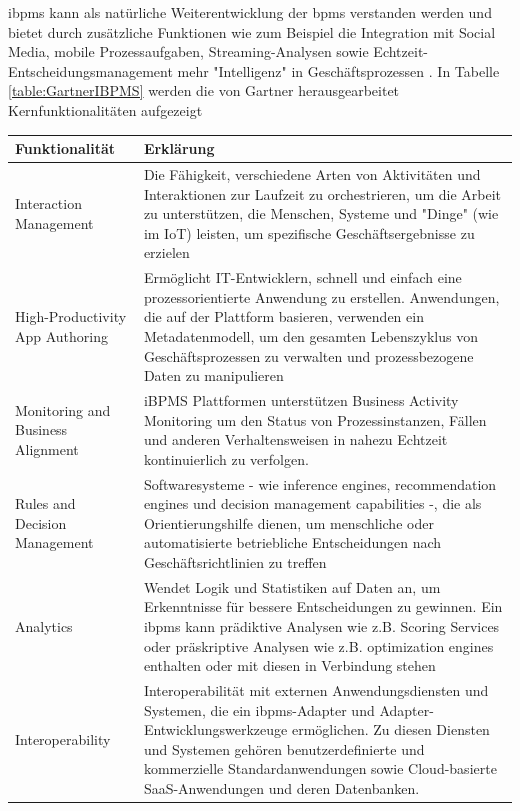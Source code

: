 \documentclass[a4paper, 12pt, twoside, headsepline=true]{scrartcl} %
\begin{document}
\ac{ibpms} kann als natürliche Weiterentwicklung der \ac{bpms} verstanden werden und bietet durch zusätzliche Funktionen wie zum Beispiel die Integration mit Social Media, mobile Prozessaufgaben, Streaming-Analysen sowie Echtzeit-Entscheidungsmanagement mehr "Intelligenz" in Geschäftsprozessen \cite{onibpms}. 
In Tabelle \ref{table:GartnerIBPMS} werden die von Gartner herausgearbeitet Kernfunktionalitäten aufgezeigt
\begin{table}[H]
	\begin{tabularx}{\textwidth}{@{}lL@{}} 
		\toprule
		\textbf{Funktionalität} & \textbf{Erklärung} 
		\\ \midrule
		Interaction Management & Die Fähigkeit, verschiedene Arten von Aktivitäten und Interaktionen zur Laufzeit zu orchestrieren, um die Arbeit zu unterstützen, die Menschen, Systeme und "Dinge" (wie im IoT) leisten, um spezifische Geschäftsergebnisse zu erzielen
		\\ \hline
		High-Productivity App Authoring & Ermöglicht  IT-Entwicklern, schnell und einfach eine prozessorientierte Anwendung zu erstellen.
		Anwendungen, die auf der Plattform basieren, verwenden ein Metadatenmodell, um den gesamten Lebenszyklus von Geschäftsprozessen zu verwalten und prozessbezogene Daten zu manipulieren
		\\ \hline
		Monitoring and Business Alignment & iBPMS Plattformen unterstützen Business Activity Monitoring um den Status von Prozessinstanzen, Fällen und anderen Verhaltensweisen in nahezu Echtzeit kontinuierlich zu verfolgen.
		\\ \hline
		Rules and Decision Management &  Softwaresysteme - wie inference engines, recommendation engines und decision management capabilities -, die als Orientierungshilfe dienen, um menschliche oder automatisierte betriebliche Entscheidungen nach Geschäftsrichtlinien zu treffen
		\\ \hline
		Analytics & Wendet Logik und Statistiken auf Daten an, um Erkenntnisse für bessere Entscheidungen zu gewinnen. Ein \ac{ibpms} kann prädiktive Analysen wie z.B. Scoring Services oder präskriptive Analysen wie z.B. optimization engines enthalten oder mit diesen in Verbindung stehen
		\\ \hline
		Interoperability &  Interoperabilität mit externen Anwendungsdiensten und Systemen, die ein \ac{ibpms}-Adapter und Adapter-Entwicklungswerkzeuge ermöglichen. Zu diesen Diensten und Systemen gehören benutzerdefinierte und kommerzielle Standardanwendungen sowie Cloud-basierte SaaS-Anwendungen und deren Datenbanken.

\end{tabularx}
\end{table}
\end{document}

